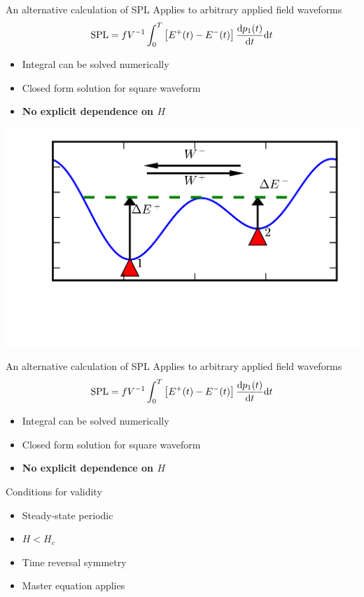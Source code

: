 \documentclass{sotonbeamer}
\begin{document}
\begin{frame}{An alternative calculation of SPL}
  Applies to arbitrary applied field waveforms
  \begin{equation*}
    \label{eq:integral}
    \textup{SPL} = fV^{-1} \int_0^T \left[ E^+(t) - E^-(
      t) \right] \dv{p_1(t)}{t} \dd t
  \end{equation*}
  \begin{itemize}
  \item Integral can be solved numerically
  \item Closed form solution for square waveform
  \item \textbf{No explicit dependence on $H$}
  \end{itemize}
  \begin{center}
    \includegraphics[width=0.4\linewidth]{figures/transitions.png}
  \end{center}
\end{frame}

\begin{frame}{An alternative calculation of SPL}
  Applies to arbitrary applied field waveforms
  \begin{equation*}
    \label{eq:integral}
    \textup{SPL} = fV^{-1} \int_0^T \left[ E^+(t) - E^-(
      t) \right] \dv{p_1(t)}{t} \dd t
  \end{equation*}
  \begin{itemize}
  \item Integral can be solved numerically
  \item Closed form solution for square waveform
  \item \textbf{No explicit dependence on $H$}
  \end{itemize}
  \begin{block}{Conditions for validity}
    \begin{multicols}{2}
      \begin{itemize}
      \item Steady-state periodic
      \item $H<H_c$
      \item Time reversal symmetry
      \item Master equation applies
      \end{itemize}
    \end{multicols}
  \end{block}
\end{frame}
\end{document}
